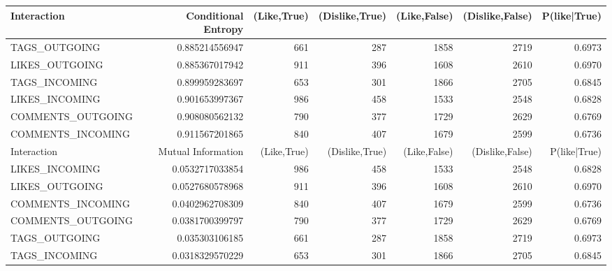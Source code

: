 	
\cleardoublepage
\begin{table}
	\centering
	\begin{tabular}{| >{\small}l | >{\small}r | >{\small}r | >{\small}r | >{\small}r | >{\small}r | >{\small}r |}
		\hline
		Interaction & Conditional Entropy & (Like,True) & (Dislike,True) & (Like,False) & (Dislike,False)  & P(like|True)\\
		\hline
		TAGS\_OUTGOING & 0.885214556947 & 661 & 287 & 1858 & 2719  & 0.6973\\
		LIKES\_OUTGOING & 0.885367017942 & 911 & 396 & 1608 & 2610 & 0.6970\\
		TAGS\_INCOMING & 0.899959283697 & 653 & 301 & 1866 & 2705 & 0.6845\\
		LIKES\_INCOMING & 0.901653997367 & 986 & 458 & 1533 & 2548 & 0.6828\\
		COMMENTS\_OUTGOING & 0.908080562132 & 790 & 377 & 1729 & 2629 & 0.6769\\
		COMMENTS\_INCOMING & 0.911567201865 & 840 & 407 & 1679 & 2599 & 0.6736\\
		\hline
		\hline
		Interaction & Mutual Information & (Like,True) & (Dislike,True) & (Like,False) & (Dislike,False)& P(like|True)\\		
		\hline
		LIKES\_INCOMING & 0.0532717033854 & 986 & 458 & 1533 & 2548 &  0.6828\\
		LIKES\_OUTGOING & 0.0527680578968 & 911 & 396 & 1608 & 2610 & 0.6970\\
		COMMENTS\_INCOMING & 0.0402962708309 & 840 & 407 & 1679 & 2599 & 0.6736\\
		COMMENTS\_OUTGOING & 0.0381700399797 & 790 & 377 & 1729 & 2629 & 0.6769\\
		TAGS\_OUTGOING & 0.035303106185 & 661 & 287 & 1858 & 2719 & 0.6973\\
		TAGS\_INCOMING & 0.0318329570229 & 653 & 301 & 1866 & 2705 & 0.6845\\
		\hline
		

\end{tabular}
\end{table}
